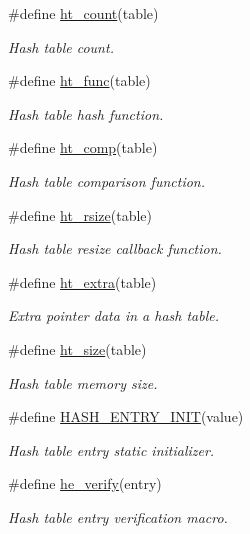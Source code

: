 \begin{CompactItemize}
\#define \hyperlink{group__dbprim__hash_a23}{ht\_\-count}(table)
\begin{CompactList}\small\item\em Hash table count.\item\end{CompactList}\item 
\#define \hyperlink{group__dbprim__hash_a24}{ht\_\-func}(table)
\begin{CompactList}\small\item\em Hash table hash function.\item\end{CompactList}\item 
\#define \hyperlink{group__dbprim__hash_a25}{ht\_\-comp}(table)
\begin{CompactList}\small\item\em Hash table comparison function.\item\end{CompactList}\item 
\#define \hyperlink{group__dbprim__hash_a26}{ht\_\-rsize}(table)
\begin{CompactList}\small\item\em Hash table resize callback function.\item\end{CompactList}\item 
\#define \hyperlink{group__dbprim__hash_a27}{ht\_\-extra}(table)
\begin{CompactList}\small\item\em Extra pointer data in a hash table.\item\end{CompactList}\item 
\#define \hyperlink{group__dbprim__hash_a28}{ht\_\-size}(table)
\begin{CompactList}\small\item\em Hash table memory size.\item\end{CompactList}\item 
\#define \hyperlink{group__dbprim__hash_a29}{HASH\_\-ENTRY\_\-INIT}(value)
\begin{CompactList}\small\item\em Hash table entry static initializer.\item\end{CompactList}\item 
\#define \hyperlink{group__dbprim__hash_a30}{he\_\-verify}(entry)
\begin{CompactList}\small\item\em Hash table entry verification macro.\item\end{CompactList}\item 

\end{CompactItemize}
